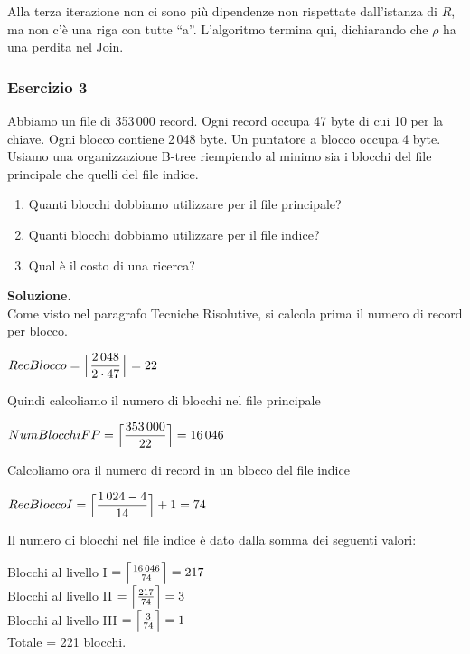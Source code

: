 Alla terza iterazione non ci sono più dipendenze non rispettate dall'istanza di $R$, ma non c'è una riga con tutte ``a''.
L'algoritmo termina qui, dichiarando che $\rho$ ha una perdita nel Join.
\subsubsection{Esercizio 3}
Abbiamo un file di 353\,000 record. Ogni record occupa 47 byte di cui 10 per la chiave. Ogni blocco contiene 2\,048 byte. 
Un puntatore a blocco occupa 4 byte. Usiamo una organizzazione B-tree riempiendo al minimo sia i blocchi del file 
principale che quelli del file indice.

\begin{enumerate}
 \item Quanti blocchi dobbiamo utilizzare per il file principale? 
 \item Quanti blocchi dobbiamo utilizzare per il file indice?
 \item Qual è il costo di una ricerca?
\end{enumerate}

\noindent\textbf{\fontsize{14pt}{1em}Soluzione.}\\
Come visto nel paragrafo Tecniche Risolutive, si calcola prima il numero di record per blocco.
\begin{center}
 $RecBlocco = \Bigl\lceil \dfrac{2\,048}{2\cdot 47} \Bigr\rceil = 22$\\
\end{center}
Quindi calcoliamo il numero di blocchi nel file principale
\begin{center}
 $NumBlocchiFP = \Bigl\lceil \dfrac{353\,000}{22} \Bigr\rceil = 16\,046$\\
\end{center}
Calcoliamo ora il numero di record in un blocco del file indice
\begin{center}
 $RecBloccoI = \Bigl\lceil \dfrac{1\,024-4}{14} \Bigr\rceil + 1 = 74$\\
\end{center}
Il numero di blocchi nel file indice è dato dalla somma dei seguenti valori:
\begin{center}
 Blocchi al livello I $= \Bigl\lceil \frac{16\,046}{74} \Bigr\rceil = 217$\\

 Blocchi al livello II $= \Bigl\lceil \frac{217}{74} \Bigr\rceil = 3$\\

 Blocchi al livello III $= \Bigl\lceil \frac{3}{74} \Bigr\rceil = 1$\\
 
 Totale = 221 blocchi.
\end{center}

